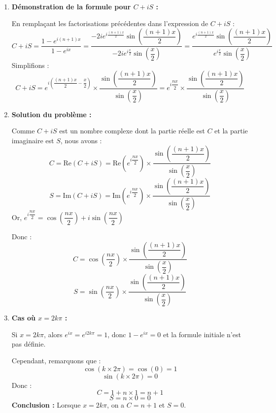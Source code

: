 \documentclass[a4paper,12pt]{article}
\begin{document}
\begin{solutionbox}
\begin{enumerate}
\begin{enumerate}
    \end{enumerate}

    \item \textbf{Démonstration de la formule pour \( C + iS \) :}

    En remplaçant les factorisations précédentes dans l'expression de \( C + iS \) :
    \[
    C + iS = \dfrac{1 - e^{i(n+1)x}}{1 - e^{ix}} = \dfrac{ -2 i e^{i \frac{(n+1)x}{2}} \sin\left( \dfrac{(n+1)x}{2} \right ) }{ -2 i e^{i \frac{x}{2}} \sin\left( \dfrac{x}{2} \right ) } = \dfrac{ e^{i \frac{(n+1)x}{2}} \sin\left( \dfrac{(n+1)x}{2} \right ) }{ e^{i \frac{x}{2}} \sin\left( \dfrac{x}{2} \right ) }
    \]
    Simplifions :
    \[
    C + iS = e^{i \left( \dfrac{(n+1)x}{2} - \dfrac{x}{2} \right ) } \times \dfrac{ \sin\left( \dfrac{(n+1)x}{2} \right ) }{ \sin\left( \dfrac{x}{2} \right ) } = e^{i \dfrac{n x}{2}} \times \dfrac{ \sin\left( \dfrac{(n+1)x}{2} \right ) }{ \sin\left( \dfrac{x}{2} \right ) }
    \]

    \item \textbf{Solution du problème :}

    Comme \( C + iS \) est un nombre complexe dont la partie réelle est \( C \) et la partie imaginaire est \( S \), nous avons :
    \[
    C = \text{Re} \left( C + iS \right ) = \text{Re} \left( e^{i \dfrac{n x}{2}} \right ) \times \dfrac{ \sin\left( \dfrac{(n+1)x}{2} \right ) }{ \sin\left( \dfrac{x}{2} \right ) }
    \]
    \[
    S = \text{Im} \left( C + iS \right ) = \text{Im} \left( e^{i \dfrac{n x}{2}} \right ) \times \dfrac{ \sin\left( \dfrac{(n+1)x}{2} \right ) }{ \sin\left( \dfrac{x}{2} \right ) }
    \]
    Or, \( e^{i \dfrac{n x}{2}} = \cos\left( \dfrac{n x}{2} \right ) + i \sin\left( \dfrac{n x}{2} \right ) \)

    Donc :
    \[
    C = \cos\left( \dfrac{n x}{2} \right ) \times \dfrac{ \sin\left( \dfrac{(n+1)x}{2} \right ) }{ \sin\left( \dfrac{x}{2} \right ) }
    \]
    \[
    S = \sin\left( \dfrac{n x}{2} \right ) \times \dfrac{ \sin\left( \dfrac{(n+1)x}{2} \right ) }{ \sin\left( \dfrac{x}{2} \right ) }
    \]

    \item \textbf{Cas où \( x = 2k\pi \) :}

    Si \( x = 2k\pi \), alors \( e^{ix} = e^{i 2k\pi} = 1 \), donc \( 1 - e^{ix} = 0 \) et la formule initiale n'est pas définie.

    Cependant, remarquons que :
    \[
    \cos(k \times 2\pi) = \cos(0) = 1
    \]
    \[
    \sin(k \times 2\pi) = 0
    \]
    Donc :
    \[
    C = 1 + n \times 1 = n + 1
    \]
    \[
    S = n \times 0 = 0
    \]
    \textbf{Conclusion :} Lorsque \( x = 2k\pi \), on a \( C = n + 1 \) et \( S = 0 \).


\end{enumerate}
\end{solutionbox}
\end{document}
